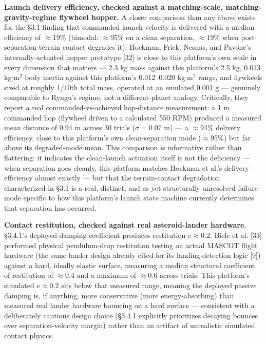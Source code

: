 \documentclass[conference]{IEEEtran}
\begin{document}
\textbf{Launch delivery efficiency, checked against a matching-scale, matching-gravity-regime flywheel hopper.} A closer comparison than any above exists for the \S3.1 finding that commanded launch velocity is delivered with a median efficiency of $\approx$19\% (bimodal: $\approx$95\% on a clean separation, $\approx$19\% when post-separation terrain contact degrades it): Hockman, Frick, Nesnas, and Pavone's internally-actuated hopper prototype [32] is close to this platform's own scale in every dimension that matters --- 2.3 kg mass against this platform's 2.5 kg, 0.013 kg$\cdot$m$^2$ body inertia against this platform's 0.012--0.020 kg$\cdot$m$^2$ range, and flywheels sized at roughly 1/10th total mass, operated at an emulated 0.001 g --- genuinely comparable to Ryugu's regime, not a different-planet analogy. Critically, they report a real commanded-vs-achieved hop-distance measurement: a 1 m commanded hop (flywheel driven to a calculated 550 RPM) produced a measured mean distance of 0.94 m across 30 trials ($\sigma = 0.07$ m) --- a $\approx$94\% delivery efficiency, close to this platform's own clean-separation mode ($\approx$95\%) but far above its degraded-mode mean. This comparison is informative rather than flattering: it indicates the clean-launch actuation itself is not the deficiency --- when separation goes cleanly, this platform matches Hockman et al.'s delivery efficiency almost exactly --- but that the terrain-contact degradation characterized in \S3.1 is a real, distinct, and as yet structurally unresolved failure mode specific to how this platform's launch state machine currently determines that separation has occurred.

\textbf{Contact restitution, checked against real asteroid-lander hardware.} \S3.4.1's deployed damping coefficient produces restitution $e \approx 0.2$. Biele et al. [33] performed physical pendulum-drop restitution testing on actual MASCOT flight hardware (the same lander design already cited for its landing-detection logic [9]) against a hard, ideally elastic surface, measuring a median structural coefficient of restitution of $\approx$0.4 and a maximum of $\approx$0.6 across trials. This platform's simulated $e \approx 0.2$ sits below that measured range, meaning the deployed passive damping is, if anything, more conservative (more energy-absorbing) than measured real lander hardware bouncing on a hard surface --- consistent with a deliberately cautious design choice (\S3.4.1 explicitly prioritizes decaying bounces over separation-velocity margin) rather than an artifact of unrealistic simulated contact physics.
\end{document}
